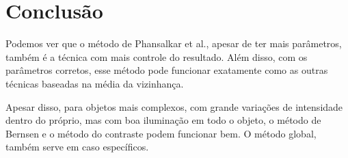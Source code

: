 \documentclass[assignment = 3]{homework}
\begin{document}
    \pagestyle{main}

    

    

    

    

    \section{Conclusão}

        Podemos ver que o método de Phansalkar et al., apesar de ter mais parâmetros, também é a técnica com mais controle do resultado. Além disso, com os parâmetros corretos, esse método pode funcionar exatamente como as outras técnicas baseadas na média da vizinhança.

        Apesar disso, para objetos mais complexos, com grande variações de intensidade dentro do próprio, mas com boa iluminação em todo o objeto, o método de Bernsen e o método do contraste podem funcionar bem. O método global, também serve em caso específicos.
\end{document}
